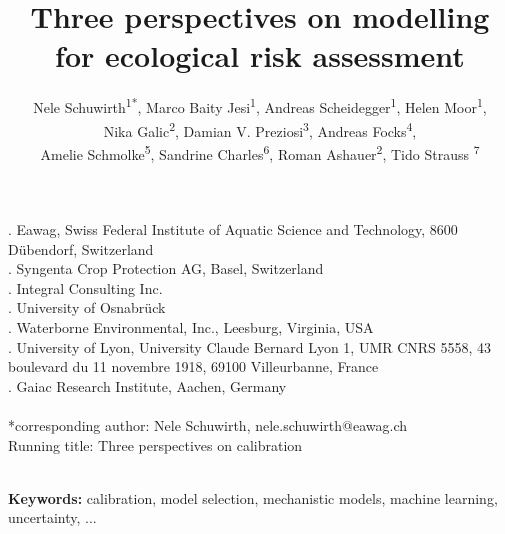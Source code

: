 \documentclass [english,11pt]{article} %
\begin{document}
\title{Three perspectives on modelling\\ for ecological risk assessment}

\author{  %
Nele Schuwirth\textsuperscript{1{*}}, 
Marco Baity Jesi\textsuperscript{1},     %
Andreas Scheidegger\textsuperscript{1},  %
Helen Moor\textsuperscript{1},\\         %
Nika Galic\textsuperscript{2},   
Damian V. Preziosi\textsuperscript{3},     %
Andreas Focks\textsuperscript{4},  \\      %
Amelie Schmolke\textsuperscript{5},
Sandrine Charles\textsuperscript{6},
Roman Ashauer\textsuperscript{2},
Tido Strauss \textsuperscript{7}            %
}  

\maketitle
\thispagestyle{fancy}
. Eawag, Swiss Federal Institute of Aquatic Science and Technology, 8600 Dübendorf, Switzerland\\
. Syngenta Crop Protection AG, Basel, Switzerland\\
. Integral Consulting Inc.\\
. University of Osnabrück\\
. Waterborne Environmental, Inc., Leesburg, Virginia, USA\\
. University of Lyon, University Claude Bernard Lyon 1, UMR CNRS 5558, 43 boulevard du 11 novembre 1918, 69100 Villeurbanne, France\\
. Gaiac Research Institute, Aachen, Germany\\
\noindent
\\

{*}corresponding author:
Nele Schuwirth, nele.schuwirth@eawag.ch\\

Running title: Three perspectives on calibration 

$ $ \\ {\bf Keywords:} calibration, model selection, mechanistic models, machine learning, uncertainty, ...



\end{document}
